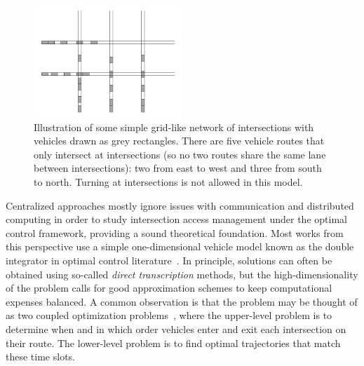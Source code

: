 \documentclass{article}
\theoremstyle{definition}
\theoremstyle{plain}
\begin{document}
\begin{figure}[b]
  \centering
  \includegraphics[width=0.5\textwidth]{figures/state_example.png}
  \caption{Illustration of some simple grid-like network of intersections
    with vehicles drawn as grey rectangles. There are five vehicle routes that
    only intersect at intersections (so no two routes share the same lane
    between intersections): two from east to west and three from south to north.
    Turning at intersections is not allowed in this
    model.}\label{fig:network_illustration}
\end{figure}

Centralized approaches mostly ignore issues with communication and distributed
computing in order to study intersection access management under the optimal
control framework, providing a sound theoretical foundation. Most works from
this perspective use a simple one-dimensional vehicle model known as the double
integrator in optimal control literature~\cite{raoNaiveControlDouble2001}. In
principle, solutions can often be obtained using so-called \textit{direct transcription}
methods, but the high-dimensionality of the problem calls for good approximation
schemes to keep computational expenses balanced. A common observation is that
the problem may be thought of as two coupled optimization problems~\cite{hultApproximateSolutionOptimal2015,zhaoBilevelProgrammingModel2021,tallapragadaHierarchicaldistributedOptimizedCoordination2017}, where
the upper-level problem is to determine when and in which order vehicles enter
and exit each intersection on their route. The lower-level problem is to find
optimal trajectories that match these time slots.
\end{document}

